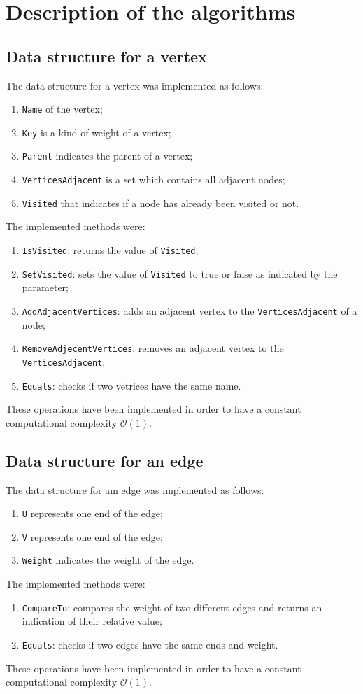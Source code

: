 \section{Description of the algorithms}

\subsection*{Data structure for a vertex}
The data structure for a vertex was implemented as follows:
\begin{enumerate}
    \item \verb|Name| of the vertex;
    \item \verb|Key| is a kind of weight of a vertex;
    \item \verb|Parent| indicates the parent of a vertex;
    \item \verb|VerticesAdjacent| is a set which contains all adjacent nodes; 
    \item \verb|Visited| that indicates if a node has already been visited or not.
\end{enumerate}
\noindent
The implemented methods were:
\begin{enumerate}
    \item \verb|IsVisited|: returns the value of \verb|Visited|;
    \item \verb|SetVisited|: sets the value of \verb|Visited| to true or false as indicated by the parameter;
    \item \verb|AddAdjacentVertices|: adds an adjacent vertex to the \verb|VerticesAdjacent| of a node;
    \item \verb|RemoveAdjecentVertices|: removes an adjacent vertex to the \verb|VerticesAdjacent|;
    \item \verb|Equals|: checks if two vetrices have the same name.
\end{enumerate}
These operations have been implemented in order to have a constant computational complexity $\mathcal{O}(1)$.

\subsection*{Data structure for an edge}
The data structure for am edge was implemented as follows:
\begin{enumerate}
    \item \verb|U| represents one end of the edge;
    \item \verb|V| represents one end of the edge;
    \item \verb|Weight| indicates the weight of the edge.
    \end{enumerate}
\noindent
The implemented methods were:
\begin{enumerate}
    \item \verb|CompareTo|: compares the weight of two different edges and returns an indication of their relative value;
    \item \verb|Equals|: checks if two edges have the same ends and weight.
\end{enumerate}
These operations have been implemented in order to have a constant computational complexity $\mathcal{O}(1)$.

